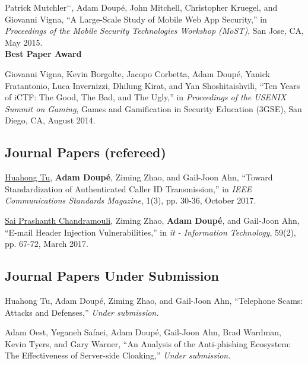 \documentclass[11pt,letterpaper,sans]{moderncv}
\begin{document}
\begin{etaremune}
\item Patrick Mutchler$^{\sim}$, Adam Doup\'e, John Mitchell,
  Christopher Kruegel, and Giovanni Vigna, ``A Large-Scale Study of
  Mobile Web App Security,'' in \emph{Proceedings of the Mobile
    Security Technologies Workshop (MoST)}, San Jose, CA, May 2015. \\
  \textbf{Best Paper Award}

\item Giovanni Vigna, Kevin Borgolte, Jacopo Corbetta, Adam
  Doup\'e, Yanick Fratantonio, Luca Invernizzi, Dhilung Kirat, and
  Yan Shoshitaishvili, ``Ten Years of iCTF: The Good, The Bad, and The
  Ugly,'' in \emph{Proceedings of the USENIX Summit on Gaming}, Games
  and Gamification in Security Education (3GSE), San Diego, CA, August
  2014.

\end{etaremune}

\subsection{Journal Papers (refereed)}

\begin{etaremune}

\item \underline{Huahong Tu}, \textbf{Adam Doup\'e}, Ziming Zhao, and
  Gail-Joon Ahn, ``Toward Standardization of Authenticated Caller ID
  Transmission,'' in \emph{IEEE Communications Standards Magazine},
    1(3), pp. 30-36, October 2017.

\item \underline{Sai Prashanth Chandramouli}, Ziming Zhao,
  \textbf{Adam Doup\'e}, and Gail-Joon Ahn, ``E-mail Header Injection
  Vulnerabilities,'' in \emph{it - Information Technology}, 59(2), pp.
  67-72, March 2017.

\end{etaremune}

\subsection{Journal Papers Under Submission}

\begin{etaremune}

  \item Huahong Tu, Adam Doup\'e, Ziming Zhao, and Gail-Joon Ahn, ``Telephone Scams: Attacks and Defenses,'' \emph{Under submission.}

  \item Adam Oest, Yeganeh Safaei, Adam Doup\'e, Gail-Joon Ahn, Brad Wardman, Kevin Tyers, and Gary Warner, ``An Analysis of the Anti-phishing Ecosystem: The Effectiveness of Server-side Cloaking,'' \emph{Under submission.}

\end{etaremune}
\end{document}
